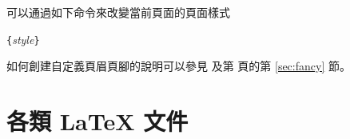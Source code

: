 可以通過如下命令來改變當前頁面的頁面樣式
\begin{lscommand}
\verb|{|\emph{style}\verb|}|
\end{lscommand}
如何創建自定義頁眉頁腳的說明可以參見 \companion{} 及第 \pageref{sec:fancy} 頁的第 \ref{sec:fancy} 節。
%
%

\section{各類 \LaTeX{} 文件}

